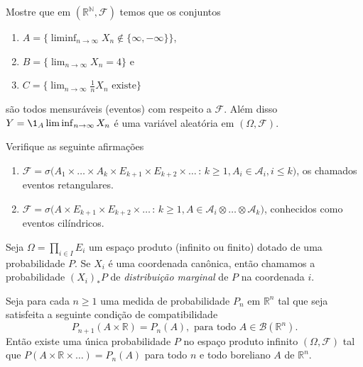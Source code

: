 \begin{exercise}
  Mostre que em $(\mathbb{R}^{\mathbb{N}},\mathcal{F})$ temos que os conjuntos
  \begin{enumerate}[\quad a)]
  \item $A = \{ \liminf_{n\to \infty} X_n \notin \{\infty,-\infty\} \}$,
  \item $B = \{ \lim_{n\to \infty} X_n = 4\}$ e
  \item $C = \{ \lim_{n\to \infty} \tfrac{1}{n} X_n \text{ existe}\}$
  \end{enumerate}
  são todos mensuráveis (eventos) com respeito a $\mathcal{F}$.
  Além disso $Y = \1_A \liminf_{n\to \infty} X_n$ é uma variável aleatória em $(\Omega, \mathcal{F})$.
\end{exercise}

\begin{exercise}
  Verifique as seguinte afirmações
  \begin{enumerate}[\quad a)]
  \item $\mathcal{F} = \sigma\big(A_1 \times \dots \times A_k \times E_{k+1} \times E_{k+2} \times \dots\, : \, k \geq 1, A_i \in \mathcal{A}_i, i \leq k\big)$,
  os chamados eventos retangulares.
  \item $\mathcal{F} = \sigma\big(A \times E_{k+1} \times E_{k+2} \times \dots\, : \, k \geq 1, A \in \mathcal{A}_i \otimes \dots \otimes \mathcal{A}_k\big)$,
  conhecidos como eventos cilíndricos.
  \end{enumerate}
\end{exercise}

\begin{definition}
  \label{d:marginal}
  Seja $\Omega = \prod_{i\in I} E_i$ um espaço produto (infinito ou finito) dotado de uma probabilidade $P$.
  Se $X_i$ é uma coordenada canônica, então chamamos a probabilidade $(X_i)_*  P$ de \emph{distribuição marginal}  de $P$ na coordenada $i$.
\end{definition}

\begin{theorem}
  \label{t:extens_kolmog}
  Seja para cada $n \geq 1$ uma medida de probabilidade $P_n$ em $\mathbb{R}^n$ tal que seja satisfeita a seguinte condição de compatibilidade 
  \begin{equation}
    \label{e:consist_kolmog}
    P_{n+1} (A \times \mathbb{R}) = P_n (A), \text{ para todo $A \in \mathcal{B}(\mathbb{R}^n)$}.
  \end{equation}
  Então existe uma única probabilidade $P$ no espaço produto infinito $(\Omega, \mathcal{F})$ tal que $P(A \times \mathbb{R} \times \dots) = P_n (A)$ para todo $n$ e todo boreliano $A$ de $\mathbb{R}^n$.
\end{theorem}

